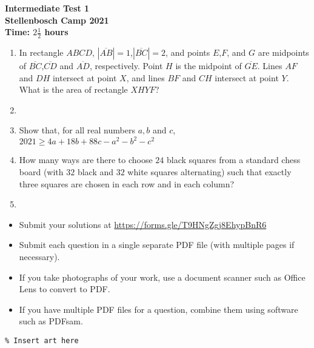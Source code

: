 \documentclass{article}
\begin{document}
\thispagestyle{empty}

\begin{center}
  \textbf{\Large Intermediate Test 1}
  \\ \vspace{1em}
  \textbf{\large Stellenbosch Camp 2021}
  \\ \vspace{1em}
  \textbf{\large Time: $2\frac{1}{2}$ hours}
\end{center}

\vspace{24pt}

\begin{enumerate}[1.]

\item %
In rectangle $ABCD$, $|\overline{AB}|=1$,$|\overline{BC}|=2$, and points $E$,$F$, and $G$ are midpoints of $\overline{BC}$,$\overline{CD}$ and $\overline{AD}$, respectively. Point $H$ is the midpoint of $\overline{GE}$. Lines $AF$ and $DH$ intersect at point $X$, and lines $BF$ and $CH$ intersect at point $Y$. What is the area of rectangle $XHYF$?


\item %


\item %
Show that, for all real numbers $a,b$ and $c$,  $2021 \geq 4a + 18b + 88c - a^2 - b^2 - c^2$ 

\item %
How many ways are there to choose $24$ black squares from a standard chess board (with $32$ black and $32$ white squares alternating) such that exactly three squares are chosen in each row and in each column?


\item %

\end{enumerate}


\vfill
\begin{itemize}
	\item Submit your solutions at \href{https://forms.gle/T9HNgZgj8EhypBnR6}{https://forms.gle/T9HNgZgj8EhypBnR6}
	\item Submit each question in a single separate PDF file (with multiple pages if necessary).
	\item If you take photographs of your work, use a document scanner such as Office Lens to convert to PDF.
	\item If you have multiple PDF files for a question, combine them using software such as PDFsam.
\end{itemize}


\vfill
\centering
\begin{BVerbatim}
\end{BVerbatim}
\end{document}
